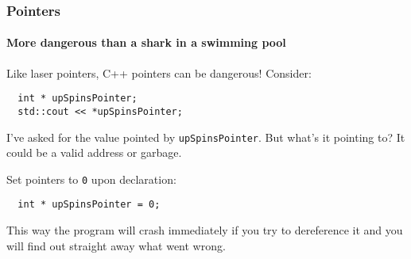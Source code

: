 \documentclass{beamer}
\begin{document}
\begin{frame}[fragile]
  \frametitle{Pointers}
  \framesubtitle{More dangerous than a shark in a swimming pool}
  \begin{warnblocke}
    Like laser pointers, C++ pointers can be dangerous!  Consider:
    \begin{lstlisting}
  int * upSpinsPointer;
  std::cout << *upSpinsPointer;
    \end{lstlisting}
    I've asked for the value pointed by \texttt{upSpinsPointer}.  But what's it pointing to?  It could be a valid address or garbage.
  \end{warnblocke}
  \begin{doblocke}
    Set pointers to \texttt{0} upon declaration:
    \begin{lstlisting}
  int * upSpinsPointer = 0;
    \end{lstlisting}
    This way the program will crash immediately if you try to dereference it and you will find out straight away what went wrong.
  \end{doblocke}

\end{frame}
\end{document}
